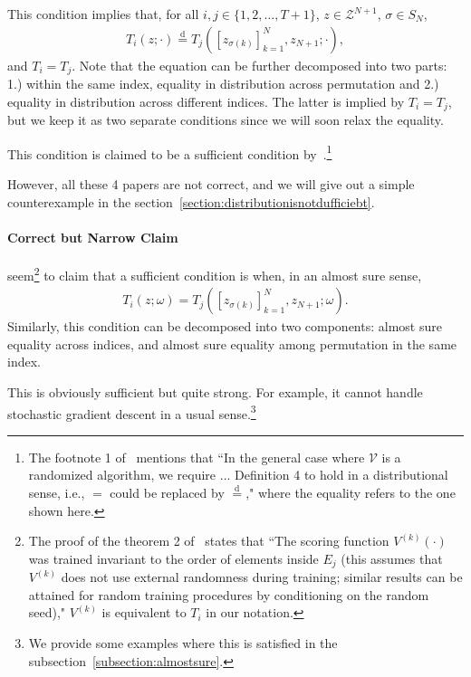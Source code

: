 \documentclass{article}
\newcommand{\oo}[1]{\left( #1 \right)}
\newcommand{\cc}[1]{\left[ #1 \right]}
\begin{document}
    This condition implies that, for all $i,j \in \{1,2,\dots, T+1\}$, $z \in \mathcal{Z}^{N+1}$, $\sigma \in S_N$,
    \begin{align*}
        T_i(z;\cdot) \overset{\text{d}}{=} 
        T_j\oo{\cc{z_{\sigma(k)}}_{k=1}^N, z_{N+1}; \cdot},
    \end{align*}
    and $T_i = T_j$. Note that the equation can be further decomposed into two parts: 1.) within the same index, equality in distribution across permutation and 2.) equality in distribution across different indices. The latter is implied by $T_i=T_j$, but we keep it as two separate conditions since we will soon relax the equality.
    
    This condition is claimed to be a sufficient condition by~\cite{bai2024optimized}.\footnote{The footnote 1 of~\citep{bai2024optimized} mentions that ``In the general case where $\mathcal{V}$ is a randomized algorithm, we require ... Definition 4 to hold in a distributional sense, i.e., $=$ could be replaced by $\overset{\text{d}}{=}$," where the equality refers to the one shown here.} 

    However, all these 4 papers are not correct, and we will give out a simple counterexample in the section~\ref{section:distributionisnotdufficiebt}.

    \paragraph{Correct but Narrow Claim} \cite{lee2025full} seem\footnote{The proof of the theorem 2 of~\citep{lee2025full} states that ``The scoring function $V^{(k)}(\cdot)$ was trained invariant to the order of elements inside $E_j$ (this assumes that $V^{(k)}$ does not use external randomness during training; similar results can be attained for random training procedures by conditioning on the random seed)," $V^{(k)}$ is equivalent to $T_i$ in our notation.} to claim that a sufficient condition is when, in an almost sure sense,
    \begin{align*}
        T_i(z;\omega) = 
        T_j\oo{\cc{z_{\sigma(k)}}_{k=1}^N, z_{N+1}; \omega}.
    \end{align*}
    Similarly, this condition can be decomposed into two components: almost sure equality across indices, and almost sure equality among permutation in the same index.

    This is obviously sufficient but quite strong. For example, it cannot handle stochastic gradient descent in a usual sense.\footnote{We provide some examples where this is satisfied in the subsection~\ref{subsection:almostsure}.}
\end{document}
